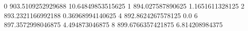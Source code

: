 0 903.5109252929688 10.64849853515625
1 894.027587890625 1.1651611328125
2 893.2321166992188 0.36968994140625
4 892.8624267578125 0.0
6 897.3572998046875 4.494873046875
8 899.6766357421875 6.814208984375
